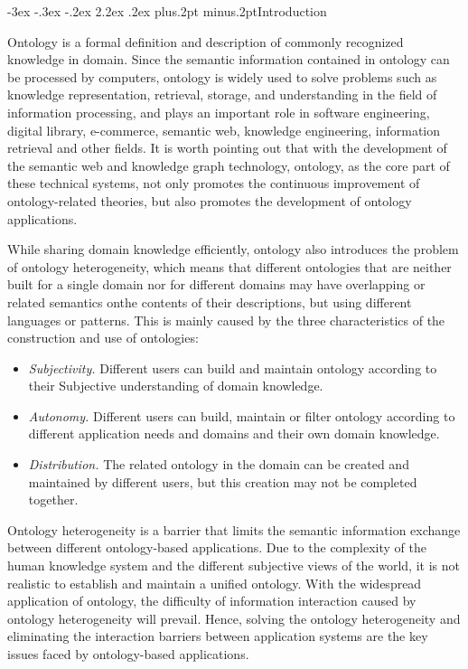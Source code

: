 \documentclass[twoside]{article}
\makeatletter
\def\section{\@startsection{section}{1}{\z@}%
 {-3ex \@plus -.3ex \@minus -.2ex}%
 {2.2ex \@plus.2ex}%
{\normalfont\normalsize\protect\baselineskip=14.5pt plus.2pt minus.2pt\bfseries}}
\makeatother
\begin{document}
\begin{multicols}{2}

\section{Introduction}

Ontology is a formal definition and description of commonly recognized knowledge in domain\cite{wwy1}.
Since the semantic information contained in ontology can be processed by computers, ontology is widely used to solve problems such as knowledge representation, retrieval, storage, and understanding in the field of information processing, and plays an important role in software engineering\cite{wwy3}, digital library\cite{wwy4}, e-commerce\cite{wwy5}, semantic web\cite{wwy6}, knowledge engineering\cite{wwy7}, information retrieval\cite{wwy8} and other fields.
It is worth pointing out that with the development of the semantic web and knowledge graph technology, ontology, as the core part of these technical systems, not only promotes the continuous improvement of ontology-related theories, but also promotes the development of ontology applications.

While sharing domain knowledge efficiently, ontology also introduces the problem of ontology heterogeneity, which means that different ontologies that are neither built for a single domain nor for different domains may have overlapping or related semantics onthe contents of their descriptions, but using different languages or patterns.
This is mainly caused by the three characteristics of the construction and use of ontologies:
\begin {itemize}
\item {\it Subjectivity.} Different users can build and maintain ontology according to their Subjective understanding of domain knowledge.
\item {\it Autonomy.} Different users can build, maintain or filter ontology according to different application needs and domains and their own domain knowledge.
\item {\it Distribution.} The related ontology in the domain can be created and maintained by different users, but this creation may not be completed together.
\end {itemize}

Ontology heterogeneity is a barrier that limits the semantic information exchange between different ontology-based applications.
Due to the complexity of the human knowledge system and the different subjective views of the world, it is not realistic to establish and maintain a unified ontology.
With the widespread application of ontology, the difficulty of information interaction caused by ontology heterogeneity will prevail.
Hence, solving the ontology heterogeneity and eliminating the interaction barriers between application systems are the key issues faced by ontology-based applications.


\end{multicols}
\end{document}
